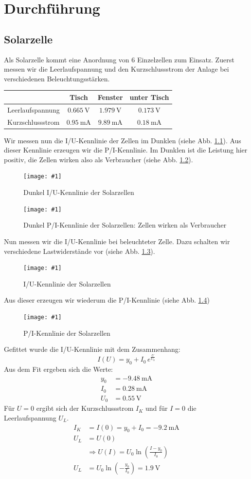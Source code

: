 ﻿\newcommand{\mess}[3] {
\begin{figure}[htbp]
	\centering
	\texttt{[image: \#1]}
	\caption{#2}
	\label{#3}
\end{figure} }
\newcommand{\refabb}[1]{(siehe Abb. \ref{#1})}
\chapter{Durchführung}

\section{Solarzelle}
Als Solarzelle kommt eine Anordnung von 6 Einzelzellen zum Einsatz. Zuerst messen wir die Leerlaufspannung und den Kurzschlussstrom der Anlage bei verschiedenen Beleuchtungsstärken.
\begin{center}
\begin{tabular}{ |  l  c  c  c | }
\hline
	& Tisch	& Fenster & unter Tisch \\ \hline	
Leerlaufspannung & $\SI{0,665}{\volt}$	& $\SI{1,979}{\volt}$	& $\SI{0,173}{\volt}$ \\ 
Kurzschlussstrom & $\SI{0,95}{\milli \ampere}$	& $\SI{9,89}{\milli \ampere}$	& $\SI{0,18}{\milli \ampere}$ \\ 
\hline
\end{tabular}
\end{center}

Wir messen nun die I/U-Kennlinie der Zellen im Dunklen \refabb{a2}.
Aus dieser Kennlinie erzeugen wir die P/I-Kennlinie. Im Dunklen ist die Leistung hier positiv, die Zellen wirken also als Verbraucher \refabb{a2pi}. 
\mess{mess/aufg2.pdf}{Dunkel I/U-Kennlinie der Solarzellen}{a2}
\mess{mess/aufg2_pi.pdf}{Dunkel P/I-Kennlinie der Solarzellen: Zellen wirken als Verbraucher}{a2pi}

Nun messen wir die I/U-Kennlinie bei beleuchteter Zelle. Dazu schalten wir verschiedene Lastwiderstände vor \refabb{a3}. 
\mess{mess/aufg3_iu.pdf}{I/U-Kennlinie der Solarzellen}{a3}
Aus dieser erzeugen wir wiederum die P/I-Kennlinie \refabb{a3pi}
\mess{mess/aufg3_pi.pdf}{P/I-Kennlinie der Solarzellen}{a3pi} 
Gefittet wurde die I/U-Kennlinie mit dem Zusammenhang:
\[
I(U) = y_0 + I_0 \, e^{\frac{U}{U_0}}
\]
Aus dem Fit ergeben sich die Werte:
\begin{align*}
	y_0 &= \SI{-9.48}{\milli \ampere}\\
	I_0 &= \SI{0.28}{\milli \ampere}\\
	U_0 &= \SI{0.55}{\volt}
\end{align*}
Für $U=0$ ergibt sich der Kurzschlussstrom $I_K$ und für $I=0$ die Leerlaufspannung $U_L$.
\begin{align*}
	I_K &= I(0) = y_0 + I_0 = \SI{-9,2}{\milli \ampere} \\
	U_L &= U(0) \\
	&\Rightarrow U(I) = U_0 \ln \left( \frac{I-y_0}{I_0} \right) \\
	U_L &= U_0 \ln \left( -\frac{y_0}{I_0} \right) = \SI{1,9}{\volt}
\end{align*}

